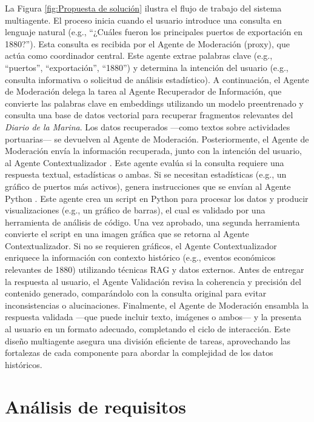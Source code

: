 La Figura \ref{fig:Propuesta de solución} ilustra el flujo de trabajo del sistema multiagente. El proceso inicia cuando el usuario introduce una consulta en lenguaje natural (e.g., “¿Cuáles fueron los principales puertos de exportación en 1880?”). Esta consulta es recibida por el Agente de Moderación (proxy), que actúa como coordinador central. Este agente extrae palabras clave (e.g., “puertos”, “exportación”, “1880”) y determina la intención del usuario (e.g., consulta informativa o solicitud de análisis estadístico). A continuación, el Agente de Moderación delega la tarea al Agente Recuperador de Información, que convierte las palabras clave en embeddings utilizando un modelo preentrenado y consulta una base de datos vectorial para recuperar fragmentos relevantes del \textit{Diario de la Marina}. Los datos recuperados —como textos sobre actividades portuarias— se devuelven al Agente de Moderación.
Posteriormente, el Agente de Moderación envía la información recuperada, junto con la intención del usuario, al Agente Contextualizador . Este agente evalúa si la consulta requiere una respuesta textual, estadísticas o ambas. Si se necesitan estadísticas (e.g., un gráfico de puertos más activos), genera instrucciones que se envían al Agente Python . Este agente crea un script en Python para procesar los datos y producir visualizaciones (e.g., un gráfico de barras), el cual es validado por una herramienta de análisis de código. Una vez aprobado, una segunda herramienta convierte el script en una imagen gráfica que se retorna al Agente Contextualizador. Si no se requieren gráficos, el Agente Contextualizador enriquece la información con contexto histórico (e.g., eventos económicos relevantes de 1880) utilizando técnicas RAG y datos externos.
Antes de entregar la respuesta al usuario, el Agente Validación revisa la coherencia y precisión del contenido generado, comparándolo con la consulta original para evitar inconsistencias o alucinaciones. Finalmente, el Agente de Moderación ensambla la respuesta validada —que puede incluir texto, imágenes o ambos— y la presenta al usuario en un formato adecuado, completando el ciclo de interacción. Este diseño multiagente asegura una división eficiente de tareas, aprovechando las fortalezas de cada componente para abordar la complejidad de los datos históricos.


\section{Análisis de requisitos}

